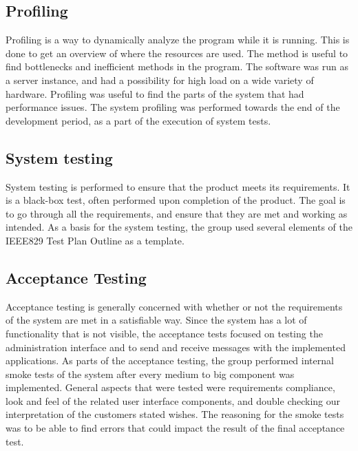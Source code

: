 \subsection{Profiling}
\label{subsec:testing-test_description-profiling}

Profiling is a way to dynamically analyze the program while it is running. This is done to get an overview of where the resources are used. The method is useful to find bottlenecks and inefficient methods in the program. The software was run as a server instance, and had a possibility for high load on a wide variety of hardware. Profiling was useful to find the parts of the system that had performance issues. The system profiling was performed towards the end of the development period, as a part of the execution of system tests.

\subsection{System testing}
\label{subsec:testing-test_description-system_testing}

System testing is performed to ensure that the product meets its requirements. It is a black-box test, often performed upon completion of the product. The goal is to go through all the requirements, and ensure that they are met and working as intended. As a basis for the system testing, the group used several elements of the IEEE829 Test Plan Outline \cite{test-plan} as a template.

\subsection{Acceptance Testing}
\label{subsec:testing-test_description-acceptance_testing}
Acceptance testing is generally concerned with whether or not the requirements of the system are met in a satisfiable way. Since the system has a lot of functionality that is not visible, the acceptance tests focused on testing the administration interface and to send and receive messages with the implemented applications.
As parts of the acceptance testing, the group performed internal smoke tests of the system after every medium to big component was implemented. General aspects that were tested were requirements compliance, look and feel of the related user interface components, and double checking our interpretation of the customers stated wishes. The reasoning for the smoke tests was to be able to find errors that could impact the result of the final acceptance test.

